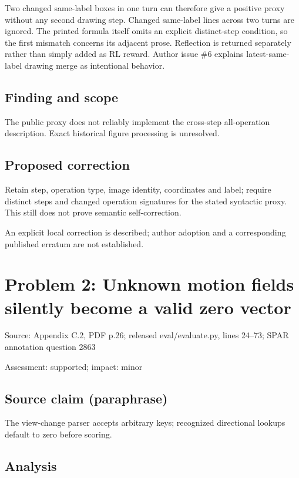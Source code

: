 \documentclass[11pt]{article}
\begin{document}
Two changed same-label boxes in one turn can therefore give a positive proxy without any second drawing step. Changed same-label lines across two turns are ignored. The printed formula itself omits an explicit distinct-step condition, so the first mismatch concerns its adjacent prose. Reflection is returned separately rather than simply added as RL reward. Author issue \#6 explains latest-same-label drawing merge as intentional behavior.

\subsection*{Finding and scope}

The public proxy does not reliably implement the cross-step all-operation description. Exact historical figure processing is unresolved.

\subsection*{Proposed correction}

Retain step, operation type, image identity, coordinates and label; require distinct steps and changed operation signatures for the stated syntactic proxy. This still does not prove semantic self-correction.

An explicit local correction is described; author adoption and a corresponding published erratum are not established.

\section*{Problem 2: Unknown motion fields silently become a valid zero vector}

Source: Appendix C.2, PDF p.26; released eval/evaluate.py, lines 24–73; SPAR annotation question 2863

Assessment: supported; impact: minor

\subsection*{Source claim (paraphrase)}

The view-change parser accepts arbitrary keys; recognized directional lookups default to zero before scoring.

\subsection*{Analysis}
\end{document}

